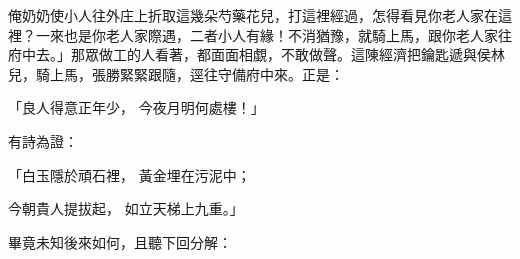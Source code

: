 俺奶奶使小人往外庄上折取這幾朵芍藥花兒，打這裡經過，怎得看見你老人家在這裡？一來也是你老人家際遇，二者小人有緣！不消猶豫，就騎上馬，跟你老人家往府中去。」那眾做工的人看著，都面面相覷，不敢做聲。這陳經濟把鑰匙遞與侯林兒，騎上馬，張勝緊緊跟隨，逕往守備府中來。正是：

「良人得意正年少，  今夜月明何處樓！」

有詩為證：

「白玉隱於頑石裡，  黃金埋在污泥中；

今朝貴人提拔起，  如立天梯上九重。」

畢竟未知後來如何，且聽下回分解：


